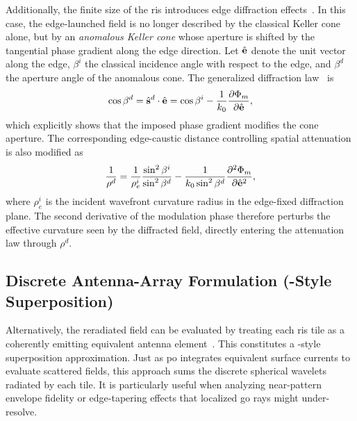 Additionally, the finite size of the \gls{ris} introduces edge diffraction effects~. In this case, the edge-launched field is no longer described by the classical Keller cone alone, but by an \emph{anomalous Keller cone} whose aperture is shifted by the tangential phase gradient along the edge direction. Let $\hat{\mathbf{e}}$ denote the unit vector along the edge, $\beta^i$ the classical incidence angle with respect to the edge, and $\beta^d$ the aperture angle of the anomalous cone. The generalized diffraction law~ is
\begin{equation}
  \cos \beta^d = \hat{\mathbf{s}}^d \cdot \hat{\mathbf{e}} = \cos \beta^i - \frac{1}{k_0}\frac{\partial \Phi_m}{\partial \hat{\mathbf{e}}},
\end{equation}
which explicitly shows that the imposed phase gradient modifies the cone aperture. The corresponding edge-caustic distance controlling spatial attenuation is also modified as~
\begin{equation}
  \frac{1}{\rho^d} = \frac{1}{\rho_e^i}\frac{\sin^2 \beta^i}{\sin^2 \beta^d} - \frac{1}{k_0\sin^2\beta^d}\frac{\partial^2 \Phi_m}{\partial \hat{\mathbf{e}}^2},
\end{equation}
where $\rho_e^i$ is the incident wavefront curvature radius in the edge-fixed diffraction plane. The second derivative of the modulation phase therefore perturbs the effective curvature seen by the diffracted field, directly entering the attenuation law through $\rho^d$.

\subsection{Discrete Antenna-Array Formulation (-Style Superposition)}

Alternatively, the reradiated field can be evaluated by treating each \gls{ris} tile as a coherently emitting equivalent antenna element~. This constitutes a -style superposition approximation. Just as \gls{po} integrates equivalent surface currents to evaluate scattered fields, this approach sums the discrete spherical wavelets radiated by each tile. It is particularly useful when analyzing near-pattern envelope fidelity or edge-tapering effects that localized \gls{go} rays might under-resolve.

